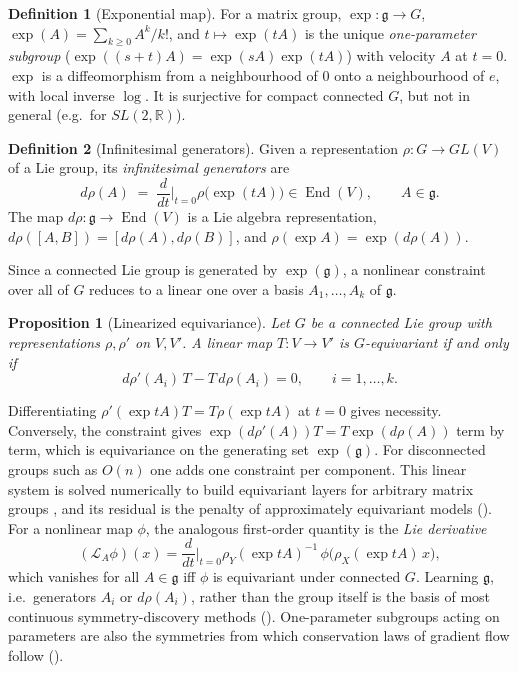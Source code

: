 \documentclass[11pt]{article}
\theoremstyle{plain}
\newtheorem{Proposition}{Proposition}[section]
\theoremstyle{definition}
\newtheorem{Definition}{Definition}[section]
\begin{document}
\begin{Definition}[Exponential map]\label{def:exp-log-map}
For a matrix group, $\exp : \mathfrak{g}\to G$, $\exp(A) = \sum_{k\geq 0}A^k/k!$, and $t\mapsto\exp(tA)$ is the unique \emph{one-parameter subgroup} ($\exp((s+t)A) = \exp(sA)\exp(tA)$) with velocity $A$ at $t=0$.
$\exp$ is a diffeomorphism from a neighbourhood of $0$ onto a neighbourhood of $e$, with local inverse $\log$.
It is surjective for compact connected $G$, but not in general (e.g.\ for $SL(2,\mathbb{R})$).
\end{Definition}

\begin{Definition}[Infinitesimal generators]\label{def:infinitesimal-generators}
Given a representation $\rho : G\to GL(V)$ of a Lie group, its \emph{infinitesimal generators} are
\[
    d\rho(A) \;=\; \frac{d}{dt}\Big|_{t=0}\rho\bigl(\exp(tA)\bigr)\in\operatorname{End}(V), \qquad A\in\mathfrak{g}.
\]
The map $d\rho : \mathfrak{g}\to\operatorname{End}(V)$ is a Lie algebra representation, $d\rho([A,B]) = [d\rho(A),d\rho(B)]$, and $\rho(\exp A) = \exp(d\rho(A))$.
\end{Definition}

Since a connected Lie group is generated by $\exp(\mathfrak{g})$, a nonlinear constraint over all of $G$ reduces to a linear one over a basis $A_1,\dots,A_k$ of $\mathfrak{g}$.

\begin{Proposition}[Linearized equivariance]\label{prop:lie-algebra-equivariance}
Let $G$ be a connected Lie group with representations $\rho, \rho'$ on $V,V'$. A linear map $T : V\to V'$ is $G$-equivariant if and only if
\[
    d\rho'(A_i)\,T - T\,d\rho(A_i) = 0, \qquad i = 1,\dots,k.
\]
\end{Proposition}

Differentiating $\rho'(\exp tA)T = T\rho(\exp tA)$ at $t=0$ gives necessity.
Conversely, the constraint gives $\exp(d\rho'(A))T = T\exp(d\rho(A))$ term by term, which is equivariance on the generating set $\exp(\mathfrak{g})$.
For disconnected groups such as $O(n)$ one adds one constraint per component.
This linear system is solved numerically to build equivariant layers for arbitrary matrix groups \citep{finzi2021p3icml}, and its residual is the penalty of approximately equivariant models ().
For a nonlinear map $\phi$, the analogous first-order quantity is the \emph{Lie derivative}
\[
    (\mathcal{L}_A\phi)(x) = \frac{d}{dt}\Big|_{t=0}\rho_Y(\exp tA)^{-1}\,\phi\bigl(\rho_X(\exp tA)\,x\bigr),
\]
which vanishes for all $A\in\mathfrak{g}$ iff $\phi$ is equivariant under connected $G$.
Learning $\mathfrak{g}$, i.e.\ generators $A_i$ or $d\rho(A_i)$, rather than the group itself is the basis of most continuous symmetry-discovery methods ().
One-parameter subgroups acting on parameters are also the symmetries from which conservation laws of gradient flow follow ().
\end{document}
